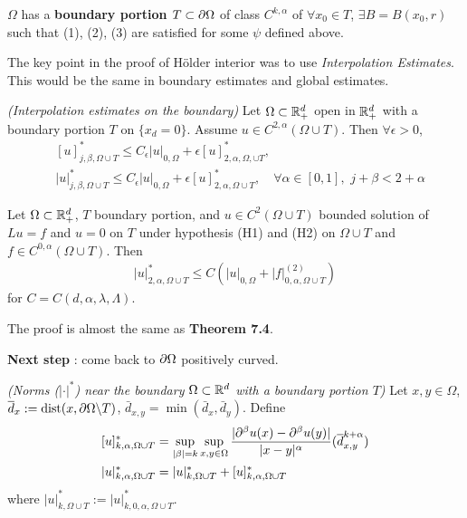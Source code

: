 \documentclass[12pt,a4paper]{article}
\newenvironment{proof}
{\begin{changemargin}{0.5cm}{0.5cm} 
	}%
	{\end{changemargin}
}
\newenvironment{p}
{\begin{proof} 
	}%
	{\end{proof}
}
\begin{document}
 $\Omega$ has a \textbf{boundary portion $T\subset \partial \Omega$} of class $C^{k, \alpha}$ of $\forall x_0 \in T$, $\exists B = B(x_0, r)$ such that (1), (2), (3) are satisfied for some $\psi$ defined above.
\s

The key point in the proof of H\"older interior was to use \emph{Interpolation Estimates}. This would be the same in boundary estimates and global estimates.
\s

 \emph{(Interpolation estimates on the boundary)} Let $\Omega\subset \mathbb{R}^d_+$ open in $\mathbb{R}^d_+$ with a boundary portion $T$ on $\{x_d =0\}$. Assume $u\in C^{2, \alpha}(\Omega \cup T)$. Then $\forall \epsilon >0$,
\begin{align*}
&[u]^*_{j, \beta, \Omega\cup T} \leq C_{\epsilon} |u|_{0, \Omega} + \epsilon [u]^*_{2, \alpha, \Omega, \cup T},  \\
&|u|^*_{j, \beta , \Omega\cup T} \leq C_{\epsilon}|u|_{0, \Omega} + \epsilon [u]^*_{2,\alpha, \Omega \cup T}, \quad \forall \alpha\in [0,1], \,\, j+ \beta < 2+ \alpha
\end{align*}
\s

 Let $\Omega \subset \mathbb{R}^d_+$, $T$ boundary portion, and $u \in C^2(\Omega \cup T)$ bounded solution of $Lu = f$ and $u=0$ on $T$ under hypothesis (H1) and (H2) on $\Omega \cup T$ and $f\in C^{0, \alpha}(\Omega \cup T)$. Then
\begin{align*}
|u|^{*}_{2, \alpha, \Omega \cup T}\leq C(|u|_{0, \Omega}+ |f|^{(2)}_{0, \alpha, \Omega \cup T})
\end{align*} 
for $C = C(d, \alpha, \lambda, \Lambda)$.
\begin{p}
\pf The proof is almost the same as \textbf{Theorem 7.4}.
\end{p}
\s

\textbf{Next step} : come back to $\partial \Omega$ positively curved.
\s

 \emph{(Norms ($|\cdot|^*$) near the boundary $\Omega \subset \mathbb{R}^d$ with a boundary portion $T$)} Let  $x,y \in \Omega$, $\overline{d}_x := \text{dist}(x, \partial \Omega \backslash T)$, $\bar{d}_{x,y} = \min (\bar{d}_x, \bar{d}_y)$. Define
\begin{align*}
& [u]^*_{k, \alpha, \Omega \cup T} = \sup_{|\beta|=k}\sup_{x,y\in \Omega} \frac{ |\partial^{\beta} u(x) - \partial^{\beta}u(y) |}{|x-y|^{\alpha}}(\overline{d}_{x,y}^{k+\alpha}) \\
& |u|^*_{k,\alpha, \Omega\cup T} = |u|^*_{k, \Omega\cup T} + [u]^*_{k,\alpha, \Omega\cup T}
\end{align*}
where $|u|^*_{k, \Omega\cup T} := |u|^*_{k,0,\alpha, \Omega\cup T}$.
\s
\end{document}
